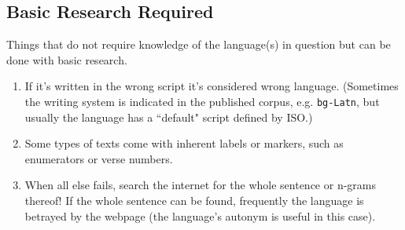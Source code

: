 \subsection*{Basic Research Required}
Things that do not require knowledge of the language(s) in question but can be done with basic research.
\begin{enumerate}
    \item If it's written in the wrong script it's considered wrong language. (Sometimes the writing system is indicated in the published corpus, e.g. \texttt{bg-Latn}, but usually the language has a ``default" script defined by ISO.)
    \item Some types of texts come with inherent labels or markers, such as enumerators or verse numbers.
    \item When all else fails, search the internet for the whole sentence or n-grams thereof! If the whole sentence can be found, frequently the language is betrayed by the webpage (the language's autonym is useful in this case).
\end{enumerate}








